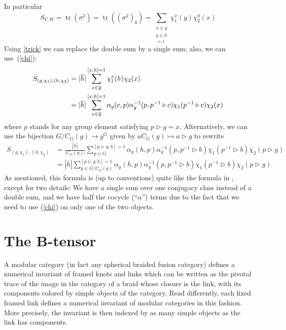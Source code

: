 \documentclass[a4paper, 10pt]{book}
\theoremstyle{definition}
\numberwithin{equation}{chapter}
\newcommand\tr{\operatorname{tr}}
\newcommand\hit{\triangleright}
\newcommand\inv{^{-1}}
\newcommand{\gb}{\overline{g}}
\newcommand{\hb}{\overline{h}}
\begin{document}
In particular
\begin{equation*}
  S_{V,W}=\tr(\sigma^2)=\tr((\sigma^2)_0)=\sum_{\substack{x\in \overline g\\y\in\overline h\\ [x,y]=e}}\chi_1^x(y)\chi_2^y(x)
\end{equation*}
Using \cref{trick} we can replace the double sum by a single sum; also, we can use~(\cref{chi}):
\begin{align*}
S_{(g, \chi_1),(h, \chi_2)} &= |\hb|\sum_{x \in \gb}^{[x,h]=1} \chi_1^x (h) \chi_2 (x)\notag\\
&=|\hb| \sum_{x \in \gb}^{[x,h]=1} \alpha_{g}(c, p) \alpha_{g}\inv(p, p\inv\hit c)\chi_1(p\inv\hit c) \chi_2 (x)
\end{align*} 
where $p$ stands for any group element satisfying $p\hit g=x$. Alternatively, we can use the bijection $G/C_G(g) \rightarrow g^G$ given by $aC_G(g)\mapsto a\hit g $ to rewrite
\begin{align*}\label{Sgroup}
  S_{(g, \chi_1),(h, \chi_2)} &=\frac{|\hb|}{|C_G(g)|}\sum^{[p\hit g,h]=1}_{p\in G} \alpha_{g}(h, p) \alpha^{-1}_{g}(p, p^{-1}\hit b)\chi_1(p^{-1}\hit b) \chi_2 (p\hit g)\\
  &={|\hb|}\sum^{[p\hit g,h]=1}_{p\in G/C_G(g)} \alpha_{g}(h, p) \alpha^{-1}_{g}(p, p^{-1}\hit b)\chi_1(p^{-1}\hit b) \chi_2 (p\hit g)
\end{align*}
As mentioned, this formula is (up to conventions) quite like the formula in \cite{MR1770077}, except for two details: We have a single sum over one conjugacy class instead of a double sum, and we have half the cocycle (``$\alpha$'') terms due to the fact that we need to use (\cref{chi}) on only one of the two objects.

\section{The B-tensor}\label{sec:borromean-tensor}

A modular category (in fact any spherical braided fusion category) defines a numerical invariant of framed knots and links which can be written as the pivotal trace of the image in the category of a braid whose closure is the link, with its components colored by simple objects of the category. Read differently, each fixed framed link defines a numerical invariant of modular categories in this fashion. More precisely, the invariant is then indexed by as many simple objects as the link has components.
\end{document}
